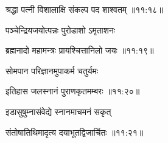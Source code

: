 
{\devanagarifont श्रद्धा पत्नी विशालाक्षि संकल्प पद शाश्वतम् {॥११:१८॥} \veg\dontdisplaylinenum }%

{\devanagarifont पञ्चेन्द्रियजयोत्पन्नः पुरोडाशो ऽमृताशनः \thinspace{\dandab} \dontdisplaylinenum }%


{\devanagarifont ब्रह्मनादो महामन्त्रः प्रायश्चित्तानिलो जयः {॥११:१९॥} \veg\dontdisplaylinenum }%

{\devanagarifont सोमपान परिज्ञानमुपाकर्म चतुर्यमः \thinspace{\dandab} \dontdisplaylinenum }%


{\devanagarifont इतिहास जलस्नानं पुराणकृतमम्बरः {॥११:२०॥} \veg\dontdisplaylinenum }%

{\devanagarifont इडासुषुम्नासंवेद्ये स्नानमाचमनं सकृत् \thinspace{\dandab} \dontdisplaylinenum }%


{\devanagarifont संतोषातिथिमादृत्य दयाभूतद्विजार्चितः {॥११:२१॥} \veg\dontdisplaylinenum }%

